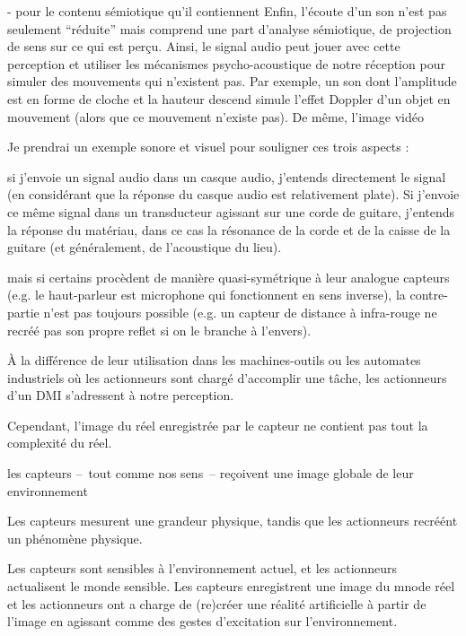 - pour le contenu sémiotique qu'il contiennent
Enfin, l'écoute d'un son n'est pas seulement ``réduite'' mais comprend une part d'analyse sémiotique, de projection de sens sur ce qui est perçu. Ainsi, le signal audio peut jouer avec cette perception et utiliser les mécanismes psycho-acoustique de notre réception pour simuler des mouvements qui n'existent pas. Par exemple, un son dont l'amplitude est en forme de cloche et la hauteur descend simule l'effet Doppler d'un objet en mouvement (alors que ce mouvement n'existe pas).
De même, l'image vidéo

Je prendrai un exemple sonore et visuel pour souligner ces trois aspects :

si j'envoie un signal audio dans un casque audio, j'entends directement le signal (en considérant que la réponse du casque audio est relativement plate). Si j'envoie ce même signal dans un transducteur agissant sur une corde de guitare, j'entends la réponse du matériau, dans ce cas la résonance de la corde et de la caisse de la guitare (et généralement, de l'acoustique du lieu). 

mais si certains procèdent de manière quasi-symétrique à leur analogue capteurs (e.g. le haut-parleur est microphone qui fonctionnent en sens inverse), la contre-partie n'est pas toujours possible (e.g. un capteur de distance à infra-rouge ne recréé pas son propre reflet si on le branche à l'envers).

À la différence de leur utilisation dans les machines-outils ou les automates industriels où les actionneurs sont chargé d'accomplir une tâche, les actionneurs d'un \gls{DMI} s'adressent à notre perception.

Cependant, l'image du réel enregistrée par le capteur ne contient pas tout la complexité du réel.

les capteurs --~tout comme nos sens~-- reçoivent une image globale de leur environnement

Les capteurs mesurent une grandeur physique, tandis que les actionneurs recréént un phénomène physique.


Les capteurs sont sensibles à l'environnement actuel, et les actionneurs actualisent le monde sensible.
Les capteurs enregistrent une image du mnode réel et les actionneurs ont a charge de (re)créer une réalité artificielle à partir de l'image en agissant comme des gestes d'excitation sur l'environnement.

